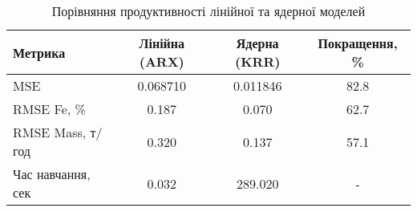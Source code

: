 
    \begin{table}[h]
    \centering
    \caption{Порівняння продуктивності лінійної та ядерної моделей}
    \label{tab:model_comparison}
    \begin{tabular}{|l|c|c|c|}
    \hline
    \textbf{Метрика} & \textbf{Лінійна (ARX)} & \textbf{Ядерна (KRR)} & \textbf{Покращення, \%} \\
    \hline
    MSE & 0.068710 & 0.011846 & 82.8 \\
    \hline
    RMSE Fe, \% & 0.187 & 0.070 & 62.7 \\
    \hline
    RMSE Mass, т/год & 0.320 & 0.137 & 57.1 \\
    \hline
    Час навчання, сек & 0.032 & 289.020 & - \\
    \hline
    \end{tabular}
    \end{table}
    